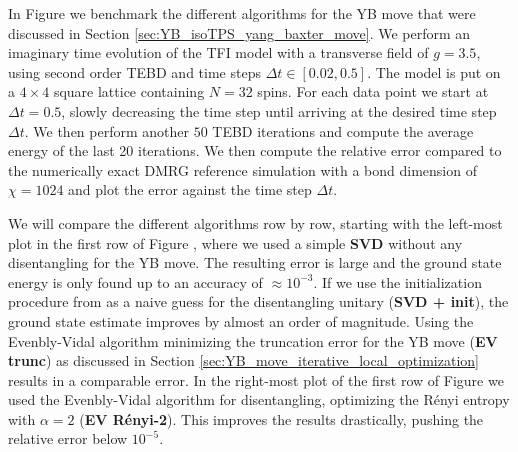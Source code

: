 In Figure  we benchmark the different algorithms for the YB move that were discussed in Section \ref{sec:YB_isoTPS_yang_baxter_move}. We perform an imaginary time evolution of the TFI model with a transverse field of $g = 3.5$, using second order TEBD and time steps $\Delta t \in \left[0.02, 0.5\right]$. The model is put on a $4\times4$ square lattice containing $N = 32$ spins. For each data point we start at $\Delta t = 0.5$, slowly decreasing the time step until arriving at the desired time step $\Delta t$. We then perform another $50$ TEBD iterations and compute the average energy of the last 20 iterations. We then compute the relative error compared to the numerically exact DMRG reference simulation with a bond dimension of $\chi = 1024$ and plot the error against the time step $\Delta t$. \par
%

%

%
We will compare the different algorithms row by row, starting with the left-most plot in the first row of Figure , where we used a simple \textbf{SVD} without any disentangling for the YB move. The resulting error is large and the ground state energy is only found up to an accuracy of $\approx10^{-3}$. If we use the initialization procedure from \cite{cite:isometric_tensor_network_states_in_two_dimensions, cite:efficient_simulation_of_dynamics_in_two_dimensional_quantum_spin_systems} as a naive guess for the disentangling unitary (\textbf{SVD + init}), the ground state estimate improves by almost an order of magnitude. Using the Evenbly-Vidal algorithm minimizing the truncation error for the YB move (\textbf{EV trunc}) as discussed in Section \ref{sec:YB_move_iterative_local_optimization} results in a comparable error. In the right-most plot of the first row of Figure  we used the Evenbly-Vidal algorithm for disentangling, optimizing the Rényi entropy with $\alpha = 2$ (\textbf{EV Rényi-2}). This improves the results drastically, pushing the relative error below $10^{-5}$. \par
